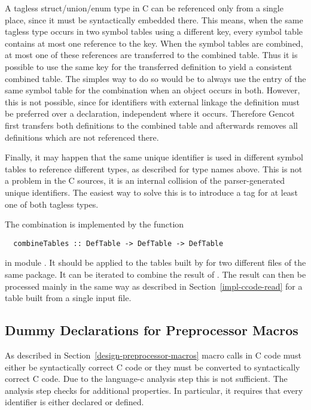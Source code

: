 A tagless struct/union/enum type in C can be referenced only from a single place, since it must be syntactically embedded
there. This means, when the same tagless type occurs in two symbol tables using a different key, every symbol table
contains at most one reference to the key. When the symbol tables are combined, at most one of these references are transferred
to the combined table. Thus it is possible to use the same key for the transferred definition to yield a consistent
combined table. The simples way to do so would be to always use the entry of the same symbol table for the combination 
when an object occurs in both. However, this is not possible, since for identifiers with external linkage the definition
must be preferred over a declaration, independent where it occurs. Therefore Gencot first transfers both definitions to the 
combined table and afterwards removes all definitions which are not referenced there.

Finally, it may happen that the same unique identifier is used in different symbol tables to reference different types, 
as described for type names above. This is not a problem in the C sources, it is an internal collision of the parser-generated 
unique identifiers. The easiest way to solve this is to introduce a tag for at least one of both tagless types.

The combination is implemented by the function
\begin{verbatim}
  combineTables :: DefTable -> DefTable -> DefTable
\end{verbatim}
in module . It should be applied to the tables built by  for two different
 files of the same package. It can be iterated to combine the result of .
The result can then be processed mainly in the same way as described in 
Section~\ref{impl-ccode-read} for a table built from a single input file.

\subsection{Dummy Declarations for Preprocessor Macros}
\label{impl-ccode-dummydecl}

As described in Section~\ref{design-preprocessor-macros} macro calls in C code must either be syntactically correct
C code or they must be converted to syntactically correct C code. Due to the language-c analysis step this is not 
sufficient. The analysis step checks for additional properties. In particular, it requires that every identifier 
is either declared or defined.

